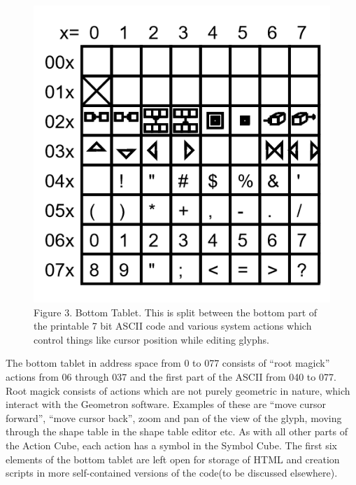 \documentclass[11pt]{article}
\begin{document}
\begin{figure}
\includegraphics[width=\linewidth]{figures/figure3_bottomTablet.png}

\caption{Figure 3. Bottom Tablet.  This is split between the bottom part of the printable 7 bit ASCII code and various system actions which control things like cursor position while editing glyphs. }
\end{figure}

    The bottom tablet in address space from 0 to 077 consists of ``root magick'' actions from 06 through 037 and the first part of the ASCII from 040 to 077.  Root magick consists of actions which are not purely geometric in nature, which interact with the Geometron software.  Examples of these are ``move cursor forward'', ``move cursor back'', zoom and pan of the view of the glyph, moving through the shape table in the shape table editor etc.  As with all other parts of the Action Cube, each action has a symbol in the Symbol Cube.  The first six elements of the bottom tablet are left open for storage of HTML and creation scripts in more self-contained versions of the code(to be discussed elsewhere).  
\end{document}
